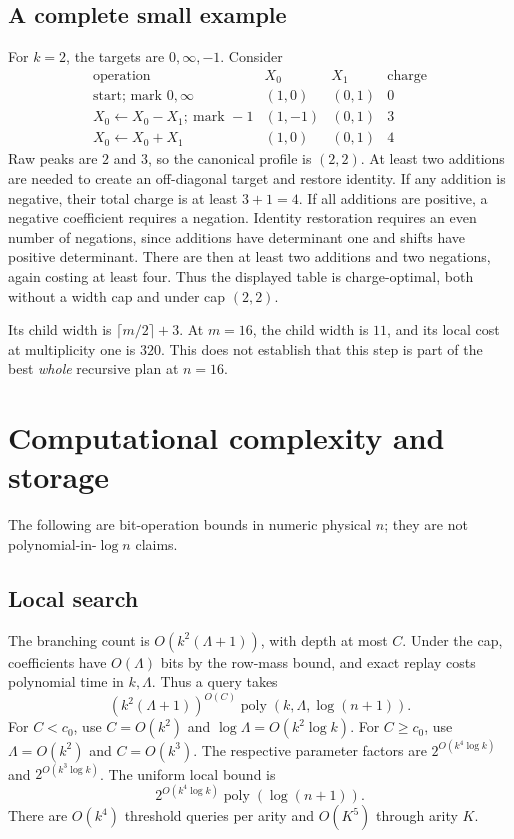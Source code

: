 \documentclass[11pt,letterpaper]{article}
\begin{document}
\clearpage
\subsection{A complete small example}
For \(k=2\), the targets are \(0,\infty,-1\). Consider
\[
\begin{array}{c|c|c|r}
\text{operation}&X_0&X_1&\text{charge}\\ \hline
\text{start; mark }0,\infty&(1,0)&(0,1)&0\\
X_0\leftarrow X_0-X_1;\ \text{mark }-1&(1,-1)&(0,1)&3\\
X_0\leftarrow X_0+X_1&(1,0)&(0,1)&4
\end{array}
\]
Raw peaks are \(2\) and \(3\), so the canonical profile is \((2,2)\).
At least two additions are needed to create an off-diagonal target
and restore identity. If any addition is negative, their total
charge is at least \(3+1=4\). If all additions are positive,
a negative coefficient requires a negation. Identity restoration
requires an even number of negations, since additions have determinant
one and shifts have positive determinant. There are then at least
two additions and two negations, again costing at least four.
Thus the displayed table is charge-optimal, both without a width cap
and under cap \((2,2)\).

Its child width is \(\lceil m/2\rceil+3\). At \(m=16\), the child
width is \(11\), and its local cost at multiplicity one is \(320\).
This does not establish that this step is part of the best
\emph{whole} recursive plan at \(n=16\).

\section{Computational complexity and storage}\label{sec:complexity}
The following are bit-operation bounds in numeric physical \(n\);
they are not polynomial-in-\(\log n\) claims.

\subsection{Local search}
The branching count is \(O(k^2(\Lambda+1))\), with depth at most \(C\).
Under the cap, coefficients have \(O(\Lambda)\) bits by the row-mass
bound, and exact replay costs polynomial time in \(k,\Lambda\).
Thus a query takes
\[
(k^2(\Lambda+1))^{O(C)}
\operatorname{poly}(k,\Lambda,\log(n+1)).
\tag{24}
\]
For \(C<c_0\), use \(C=O(k^2)\) and
\(\log\Lambda=O(k^2\log k)\).
For \(C\ge c_0\), use \(\Lambda=O(k^2)\) and \(C=O(k^3)\).
The respective parameter factors are
\(2^{O(k^4\log k)}\) and \(2^{O(k^3\log k)}\).
The uniform local bound is
\[
2^{O(k^4\log k)}\operatorname{poly}(\log(n+1)).
\tag{25}
\]
There are \(O(k^4)\) threshold queries per arity and \(O(K^5)\)
through arity \(K\).
\end{document}
